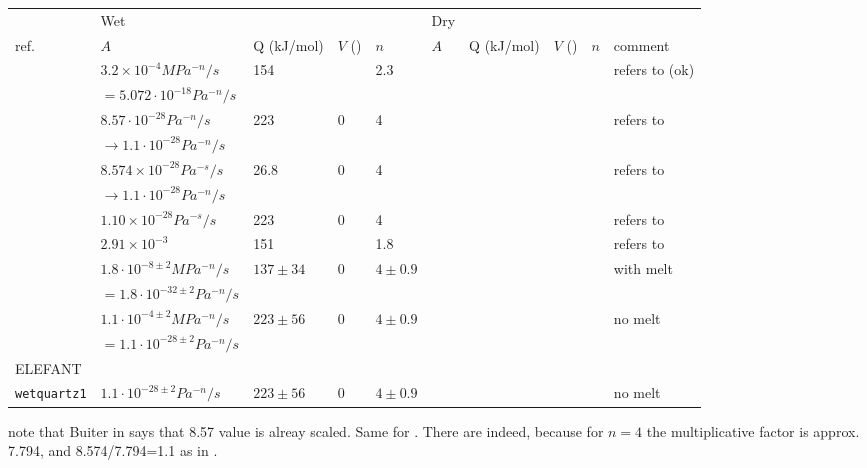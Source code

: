 \begin{tabular}{|l|llll|llll|p{4cm}|}
\hline
         & Wet                   &            &        &       & Dry           &           &        &     &\\
ref.     & $A$        & Q (kJ/mol) & $V$ () & $n$   & $A$  & Q (kJ/mol) & $V$ () & $n$ & comment\\
\hline\hline
\cite{gumb08} & $3.2\times 10^{-4}MPa^{-n}/s$   & 154        &        & 2.3   &               &           &        &     & refers to \cite{rana00} (ok)\\
              & $=5.072\cdot10^{-18}Pa^{-n}/s$    &&&&&&&&\\
\cite{tebu12} & $8.57\cdot10^{-28}Pa^{-n}/s$  & 223 & 0 &  4 &&&&& refers to \cite{gltu95}\\ 
              & $\rightarrow 1.1\cdot10^{-28}Pa^{-n}/s$ &&&&&&&& \\ 
\cite{jahu12} & $8.574\times10^{-28}Pa^{-s}/s$ & 26.8 & 0 & 4   &&&&& refers to \cite{gltu95}\\
              & $\rightarrow 1.1\cdot10^{-28}Pa^{-n}/s$  &&&&&&&& \\ 
\cite{hube03,hube07,cube11,grpy12} & $1.10\times10^{-28}Pa^{-s}/s$ & 223 & 0 & 4   &&&&& refers to \cite{gltu95}\\
\cite{bemh00} & $2.91\times10^{-3}$  & 151 & & 1.8 &&&&& refers to \cite{jatk84} \\
\cite{gltu95} & $1.8\cdot10^{-8\pm2}MPa^{-n}/s$  & $137\pm34$ & 0 & $4\pm0.9$ &&&&& with melt \\ 
              & $=1.8\cdot10^{-32\pm2} Pa^{-n}/s$ &&&&&&&&\\ 
              & $1.1\cdot10^{-4\pm2}MPa^{-n}/s$  & $223\pm56$ & 0 & $4\pm0.9$ &&&&& no melt\\
              & $=1.1\cdot10^{-28\pm2} Pa^{-n}/s$ &&&&&&&&\\ 
\hline\hline
ELEFANT & &&&&&&&&\\
{\tt wetquartz1} & $1.1\cdot10^{-28\pm2} Pa^{-n}/s$ &  $223\pm56$ & 0 & $4\pm0.9$ &&&&& no melt\\
\hline
\end{tabular}

note that Buiter in \cite{tebu12} says that 8.57 value is alreay scaled. Same for \cite{jahu12}. 
There are indeed, because for $n=4$ the multiplicative factor is approx. 7.794, and 
8.574/7.794=1.1 as in \cite{gltu95}.

